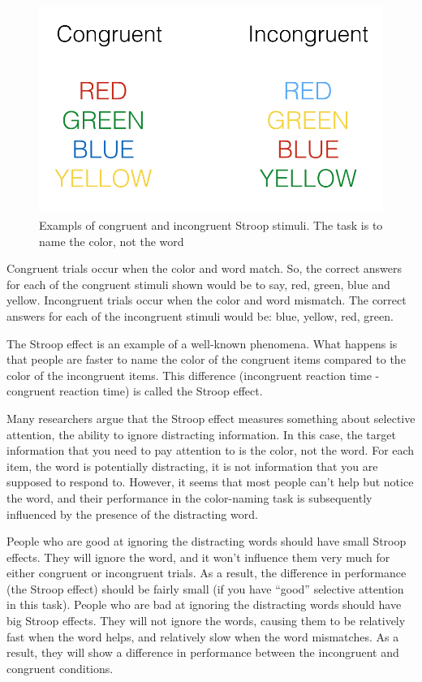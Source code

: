 \documentclass[
]{book}
\begin{document}
\begin{figure}
\centering
\includegraphics{figures/Stroop.png}
\caption{\label{fig:9stroop}Exampls of congruent and incongruent Stroop stimuli. The task is to name the color, not the word}
\end{figure}

Congruent trials occur when the color and word match. So, the correct answers for each of the congruent stimuli shown would be to say, red, green, blue and yellow. Incongruent trials occur when the color and word mismatch. The correct answers for each of the incongruent stimuli would be: blue, yellow, red, green.

The Stroop effect is an example of a well-known phenomena. What happens is that people are faster to name the color of the congruent items compared to the color of the incongruent items. This difference (incongruent reaction time - congruent reaction time) is called the Stroop effect.

Many researchers argue that the Stroop effect measures something about selective attention, the ability to ignore distracting information. In this case, the target information that you need to pay attention to is the color, not the word. For each item, the word is potentially distracting, it is not information that you are supposed to respond to. However, it seems that most people can't help but notice the word, and their performance in the color-naming task is subsequently influenced by the presence of the distracting word.

People who are good at ignoring the distracting words should have small Stroop effects. They will ignore the word, and it won't influence them very much for either congruent or incongruent trials. As a result, the difference in performance (the Stroop effect) should be fairly small (if you have ``good'' selective attention in this task). People who are bad at ignoring the distracting words should have big Stroop effects. They will not ignore the words, causing them to be relatively fast when the word helps, and relatively slow when the word mismatches. As a result, they will show a difference in performance between the incongruent and congruent conditions.
\end{document}
